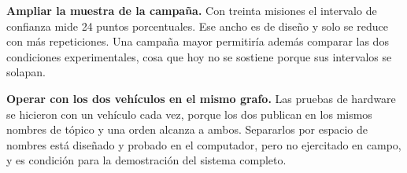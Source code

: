 \textbf{Ampliar la muestra de la campaña.} Con treinta misiones el intervalo de
confianza mide 24 puntos porcentuales. Ese ancho es de diseño y solo se reduce
con más repeticiones. Una campaña mayor permitiría además comparar las dos
condiciones experimentales, cosa que hoy no se sostiene porque sus intervalos se
solapan.

\textbf{Operar con los dos vehículos en el mismo grafo.} Las pruebas de hardware
se hicieron con un vehículo cada vez, porque los dos publican en los mismos
nombres de tópico y una orden alcanza a ambos. Separarlos por espacio de nombres
está diseñado y probado en el computador, pero no ejercitado en campo, y es
condición para la demostración del sistema completo.
